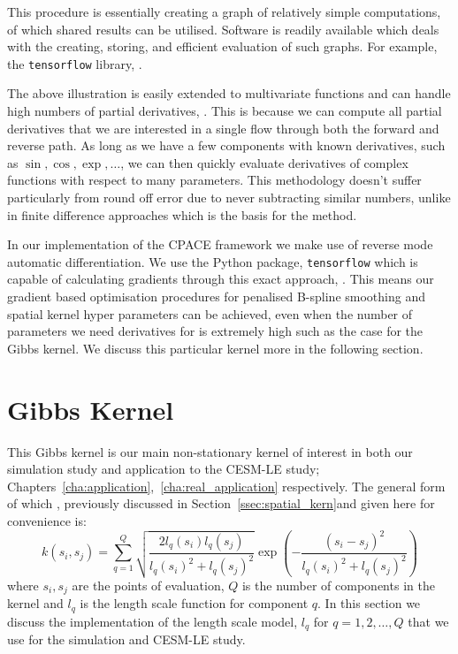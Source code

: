 This procedure is essentially creating a graph of relatively simple computations, of which shared results can be utilised.
Software is readily available which deals with the creating, storing, and efficient evaluation of such graphs.
For example, the \verb*|tensorflow| library, \citep{abadi_tensorflow_2016}.

The above illustration is easily extended to multivariate functions and can handle high numbers of partial derivatives, \citep{neidinger_introduction_2010}.
This is because we can compute all partial derivatives that we are interested in a single flow through both the forward and reverse path.
As long as we have a few components with known derivatives, such as $\sin, \cos, \exp, \dots$, we can then quickly evaluate derivatives of complex functions with respect to many parameters.
This methodology doesn't suffer particularly from round off error due to never subtracting similar numbers, unlike in finite difference approaches which is the basis for the method.

In our implementation of the CPACE framework we make use of reverse mode automatic differentiation.
We use the Python package, \verb*|tensorflow| which is capable of calculating gradients through this exact approach, \citep{abadi_tensorflow_2016}. 
This means our gradient based optimisation procedures for penalised B-spline smoothing and spatial kernel hyper parameters can be achieved, even when the number of parameters we need derivatives for is extremely high such as the case for the Gibbs kernel.
We discuss this particular kernel more in the following section.


\section{Gibbs Kernel \label{sec:gibbs_kernel}}
This Gibbs kernel is our main non-stationary kernel of interest in both our simulation study and application to the CESM-LE study; Chapters~\ref{cha:application},~\ref{cha:real_application} respectively.
The general form of which , previously discussed in Section~\ref{ssec:spatial_kern}and given here for convenience is: 
\begin{equation}
	k\left(s_{i}, s_{j}\right) = \sum_{q=1}^{Q} \sqrt{\frac{2l_q(s_i)l_q(s_j)}{l_q(s_i)^2 + l_q(s_j)^2}} \exp \left(-\frac{\left(s_i - s_j\right)^2}{l_q(s_i)^2 + l_q(s_j)^2}\right)
\end{equation}
where $s_i, s_j$ are the points of evaluation, $Q$ is the number of components in the kernel and $l_q$ is the length scale  function for component $q$.
In this section we discuss the implementation of the length scale model, $l_q$ for $q=1,2,\dots,Q$ that we use for the simulation and CESM-LE study.


